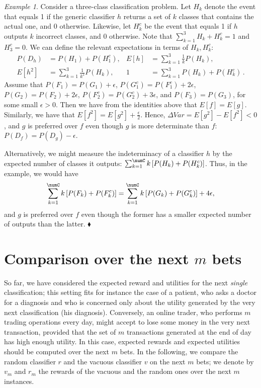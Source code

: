 \documentclass[a4paper,10pt,reqno]{amsart}
\theoremstyle{remark}
\newtheorem{example}{Example}
\begin{document}
 \begin{example}
   Consider a three-class classification problem. Let
   $H_k$ denote the event that equals 1 if the generic classifier $h$
   returns a set of $k$ classes that contains the actual one, and
   0 otherwise. Likewise, let $H_k^c$ be the event that equals 1 if
   $h$ outputs $k$ incorrect classes, and 0 otherwise. Note that
   $\sum_{k=1}^{3} H_k + H_k^c=1$ and $H_{3}^c = 0$. We can define the
   relevant expectations in terms of $H_k,H_k^c$:
 \begin{align*}
   P(D_h) &= P(H_1) + P(H_1^c), &
  E[h] &= \sum_{k=1}^{3} \frac{1}{k} P(H_k),\\
  E[h^2] &= \sum_{k=1}^{3} \frac{1}{k^2} P(H_k), &
  1 &= \sum_{k=1}^{3} P(H_k) + P(H_k^c)  \, .
 \end{align*}
 Assume that $P(F_1)=P(G_1)+\epsilon$, $P(G_1^c)=P(F_1^c)+2\epsilon$,
 $P(G_2)=P(F_2)+2\epsilon$, $P(F_2^c)=P(G_2^c)+3\epsilon$, and
 $P(F_3)=P(G_3)$, for some small $\epsilon>0$. Then we have from the identities above that
 $E[f] = E[g]$.  Similarly, we have that $E[f^2] = E[g^2] + \frac{\epsilon}{2}$. Hence, $\Delta Var = E[g^2] - E[f^2] < 0$, and $g$ is preferred over $f$ even though $g$ is more determinate than $f$: $P(D_f) = P(D_g) -\epsilon$.

 Alternatively, we might measure the indeterminacy of a classifier $h$ by
 the expected number of classes it outputs:
$\sum_{k=1}^{\numC} k \left [ P(H_k) + P(H_k^c) \right ]$. Thus, in the example, we would have
\begin{align*}
  \sum_{k=1}^{\numC} k \left [ P(F_k) + P(F_k^c) \right ] = \sum_{k=1}^{\numC} k \left [ P(G_k) + P(G_k^c) \right ]  + 4\epsilon,
\end{align*}
and $g$ is preferred over $f$ even though the former has a smaller
expected number of outputs than the latter. $\blacklozenge$
\end{example}
  
\section{Comparison over the next $m$ bets}\label{sec:mbets}
So far, we have considered the expected reward and utilities for the next \emph{single} classification; this setting fits for instance the case of a patient, who asks a doctor for a diagnosis and who is concerned only about the utility generated by the very next classification (his diagnosis). Conversely, an online trader, who performs $m$ trading operations every day, might accept to lose some money in the very next transaction, provided that the set of $m$ transactions generated at the end of day has high enough utility.  In this case, expected rewards and expected utilities should be computed over the
next $m$ bets. In the following, we compare the random classifier $r$ and the vacuous classifier $v$ on the next $m$ bets; we denote by $v_m$ and $r_m$  the rewards of the vacuous and the random ones over the next $m$ instances. 
\end{document}
